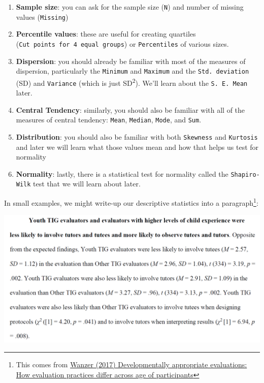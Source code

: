\documentclass[
]{book}
\providecommand{\tightlist}{%
  \setlength{\itemsep}{0pt}\setlength{\parskip}{0pt}}
\begin{document}
\begin{enumerate}
\def\labelenumi{\arabic{enumi}.}
\tightlist
\item
  \textbf{Sample size}: you can ask for the sample size (\texttt{N}) and number of missing values (\texttt{Missing})
\item
  \textbf{Percentile values}: these are useful for creating quartiles (\texttt{Cut\ points\ for\ 4\ equal\ groups}) or \texttt{Percentiles} of various sizes.
\item
  \textbf{Dispersion}: you should already be familiar with most of the measures of dispersion, particularly the \texttt{Minimum} and \texttt{Maximum} and the \texttt{Std.\ deviation} (SD) and \texttt{Variance} (which is just SD\textsuperscript{2}). We'll learn about the \texttt{S.\ E.\ Mean} later.
\item
  \textbf{Central Tendency}: similarly, you should also be familiar with all of the measures of central tendency: \texttt{Mean}, \texttt{Median}, \texttt{Mode}, and \texttt{Sum}.
\item
  \textbf{Distribution}: you should also be familiar with both \texttt{Skewness} and \texttt{Kurtosis} and later we will learn what those values mean and how that helps us test for normality
\item
  \textbf{Normality}: lastly, there is a statistical test for normality called the \texttt{Shapiro-Wilk} test that we will learn about later.
\end{enumerate}

In small examples, we might write-up our descriptive statistics into a paragraph\footnote{This comes from \href{https://thesiscommons.org/bk57d/}{Wanzer (2017) Developmentally appropriate evaluations: How evaluation practices differ across age of participants}}:

\includegraphics[width=6.27083in,height=\textheight]{images/02-stats-foundations/example1.png}
\end{document}
